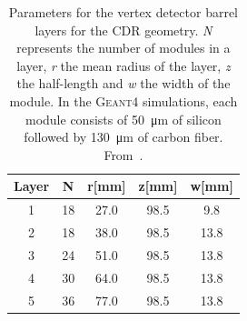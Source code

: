 \begin{table}[H]
  \caption{Parameters for the vertex detector barrel layers for the CDR geometry. \textit{N} represents the number of modules in a layer, \textit{r} the mean radius of the layer, \textit{z} the half-length and \textit{w} the width of the module. In the \textsc{Geant4} simulations, each module consists of \SI{50}{\micro\meter} of silicon followed by \SI{130}{\micro\meter} of carbon fiber. From~\cite{Grefe2011}.}
  \begin{center}
    \begin{tabular}{ c c c c c }
      \hline
      Layer & N & r[mm] & z[mm] & w[mm]\\ \hline \hline
      1 & 18 & 27.0 & 98.5 & 9.8 \\ \hline
      2 & 18 & 38.0 & 98.5 & 13.8 \\ \hline
      3 & 24 & 51.0 & 98.5 & 13.8 \\ \hline
      4 & 30 & 64.0 & 98.5 & 13.8 \\ \hline
      5 & 36 & 77.0 & 98.5 & 13.8 \\ \hline
    \end{tabular}
  \end{center}
  \label{tab:params_default}
\end{table}

